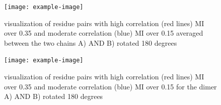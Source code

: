 \documentclass{biophys-new}
\begin{document}
\begin{figure}[mutual-information-average]
\centering
\texttt{[image: example-image]}
\caption{visualization of residue pairs with high correlation (red lines) MI over 0.35 and moderate correlation (blue) MI over 0.15 averaged between the two chains A) AND B) rotated 180 degrees}
\label{fig:view}
\end{figure}

\begin{figure}[mutual-information-average]
\centering
\texttt{[image: example-image]}
\caption{visualization of residue pairs with high correlation (red lines) MI over 0.35 and moderate correlation (blue) MI over 0.15 for the dimer A) AND B) rotated 180 degrees}
\label{fig:view}
\end{figure}
\end{document}
